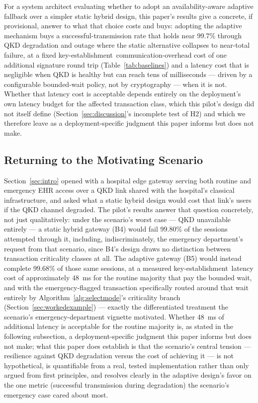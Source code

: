 \documentclass[journal]{IEEEtran}
\newcommand{\keyest}{key-establishment}
\begin{document}
For a system architect evaluating whether to adopt an availability-aware adaptive fallback over a simpler static hybrid design, this paper's results give a concrete, if provisional, answer to what that choice costs and buys: adopting the adaptive mechanism buys a successful-transmission rate that holds near 99.7\% through QKD degradation and outage where the static alternative collapses to near-total failure, at a fixed \keyest\ communication-overhead cost of one additional signature round trip (Table~\ref{tab:baselines}) and a latency cost that is negligible when QKD is healthy but can reach tens of milliseconds --- driven by a configurable bounded-wait policy, not by cryptography --- when it is not. Whether that latency cost is acceptable depends entirely on the deployment's own latency budget for the affected transaction class, which this pilot's design did not itself define (Section~\ref{sec:discussion}'s incomplete test of H2) and which we therefore leave as a deployment-specific judgment this paper informs but does not make.

\subsection{Returning to the Motivating Scenario}

Section~\ref{sec:intro} opened with a hospital edge gateway serving both routine and emergency EHR access over a QKD link shared with the hospital's classical infrastructure, and asked what a static hybrid design would cost that link's users if the QKD channel degraded. The pilot's results answer that question concretely, not just qualitatively: under the scenario's worst case --- QKD unavailable entirely --- a static hybrid gateway (B4) would fail 99.80\% of the sessions attempted through it, including, indiscriminately, the emergency department's request from that scenario, since B4's design draws no distinction between transaction criticality classes at all. The adaptive gateway (B5) would instead complete 99.68\% of those same sessions, at a measured \keyest\ latency cost of approximately \qty{48}{ms} for the routine majority that pay the bounded wait, and with the emergency-flagged transaction specifically routed around that wait entirely by Algorithm~\ref{alg:selectmode}'s criticality branch (Section~\ref{sec:workedexample}) --- exactly the differentiated treatment the scenario's emergency-department vignette motivated. Whether \qty{48}{ms} of additional latency is acceptable for the routine majority is, as stated in the following subsection, a deployment-specific judgment this paper informs but does not make; what this paper does establish is that the scenario's central tension --- resilience against QKD degradation versus the cost of achieving it --- is not hypothetical, is quantifiable from a real, tested implementation rather than only argued from first principles, and resolves clearly in the adaptive design's favor on the one metric (successful transmission during degradation) the scenario's emergency case cared about most.
\end{document}
